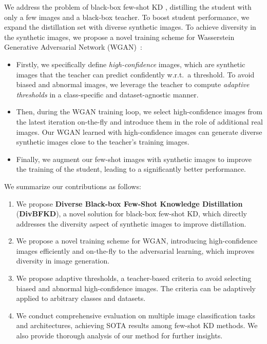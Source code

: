 \begin{foldable}
  We address the problem of black-box few-shot KD \ie, distilling the student with only a few images and a black-box teacher.
  To boost student performance, we expand the distillation set with diverse synthetic images.
  To achieve diversity in the synthetic images, we propose a novel training scheme for Wasserstein Generative Adversarial Network (WGAN)~\cite{arjovsky2017wasserstein}:
  \begin{itemize}
    \item {
        Firstly, we specifically define \textit{high-confidence} images, which are synthetic images that the teacher can predict confidently w.r.t.\ a threshold.
        To avoid biased and abnormal images, we leverage the teacher to compute \textit{adaptive thresholds} in a class-specific and dataset-agnostic manner.
      }
    \item {
        Then, during the WGAN training loop, we select high-confidence images from the latest iteration on-the-fly and introduce them in the role of additional real images.
        Our WGAN learned with high-confidence images can generate diverse synthetic images close to the teacher's training images.
      }
    \item Finally, we augment our few-shot images with synthetic images to improve the training of the student, leading to a significantly better performance.
  \end{itemize}
\end{foldable}

\begin{foldable}
  We summarize our contributions as follows:
  \begin{enumerate}
    \item We propose \textbf{Diverse Black-box Few-Shot Knowledge Distillation} (\textbf{DivBFKD}), a novel solution for black-box few-shot KD, which directly addresses the diversity aspect of synthetic images to improve distillation.
    \item We propose a novel training scheme for WGAN, introducing high-confidence images efficiently and on-the-fly to the adversarial learning, which improves diversity in image generation.
    \item {
        We propose adaptive thresholds, a teacher-based criteria to avoid selecting biased and abnormal high-confidence images.
        The criteria can be adaptively applied to arbitrary classes and datasets.
      }
    \item {
        We conduct comprehensive evaluation on multiple image classification tasks and architectures, achieving SOTA results among few-shot KD methods.
        We also provide thorough analysis of our method for further insights.
      }
  \end{enumerate}
\end{foldable}
